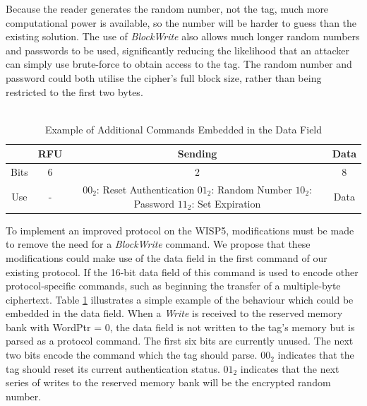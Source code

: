 \documentclass[journal]{IEEEtran}
\begin{document}
        Because the reader generates the random number, not the tag, much more computational power is available, so the number will be harder to guess than the existing solution.
        The use of \textit{BlockWrite} also allows much longer random numbers and passwords to be used, significantly reducing the likelihood that an attacker can simply use brute-force to obtain access to the tag.
        The random number and password could both utilise the cipher's full block size, rather than being restricted to the first two bytes.
        \\\\
        \begin{table}[!t]
            \renewcommand{\arraystretch}{1.3}
            \caption{Example of Additional Commands Embedded in the Data Field}
            \label{data-cmd}
            \centering
            \begin{tabular}{|c|c|c|c|}
                \hline
                 & RFU & Sending & Data\\
                \hline
                Bits & 6 & 2 & 8\\
                \hline
                Use & - & \parbox[t]{1.2in}{$00_2$: Reset Authentication \\$01_2$: Random Number \\$10_2$: Password \\$11_2$: Set Expiration} & Data\\
                \hline
            \end{tabular}
        \end{table}
        To implement an improved protocol on the WISP5, modifications must be made to remove the need for a \textit{BlockWrite} command.
        We propose that these modifications could make use of the data field in the first command of our existing protocol.
        If the 16-bit data field of this command is used to encode other protocol-specific commands, such as beginning the transfer of a multiple-byte ciphertext.
        Table \ref{data-cmd} illustrates a simple example of the behaviour which could be embedded in the data field.
        When a \textit{Write} is received to the reserved memory bank with WordPtr = 0, the data field is not written to the tag's memory but is parsed as a protocol command.
        The first six bits are currently unused.
        The next two bits encode the command which the tag should parse.
        $00_2$ indicates that the tag should reset its current authentication status.
        $01_2$ indicates that the next series of writes to the reserved memory bank will be the encrypted random number.
\end{document}
